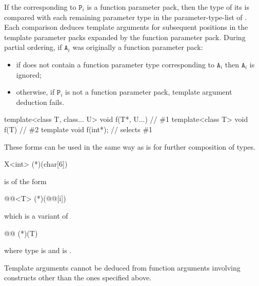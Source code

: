 If the 
corresponding to $\texttt{P}_i$ is a function parameter pack,
then the type of its  is compared with
each remaining parameter type in the parameter-type-list
of . Each comparison deduces template arguments for
subsequent positions in the template parameter packs expanded by the
function parameter pack.
During partial ordering, if $\texttt{A}_i$ was
originally a function parameter pack:

\begin{itemize}
\item if  does not contain a function parameter type corresponding to
$\texttt{A}_i$ then $\texttt{A}_i$ is ignored;

\item otherwise, if $\texttt{P}_i$ is not a function parameter pack, template
argument deduction fails.
\end{itemize}
\begin{example}
\begin{codeblock}
template<class T, class... U> void f(T*, U...) { }  // \#1
template<class T>             void f(T) { }         // \#2
template void f(int*);                              // selects \#1
\end{codeblock}
\end{example}

\pnum
These forms can be used in the same way as
is for further composition of types.
\begin{example}

\begin{codeblock}
X<int> (*)(char[6])
\end{codeblock}

is of the form

\begin{codeblock}
@@<T> (*)(@@[i])
\end{codeblock}

which is a variant of

\begin{codeblock}
@@ (*)(T)
\end{codeblock}

where type is
and
is
.
\end{example}

\pnum
Template arguments cannot be deduced from function arguments involving
constructs other than the ones specified above.


